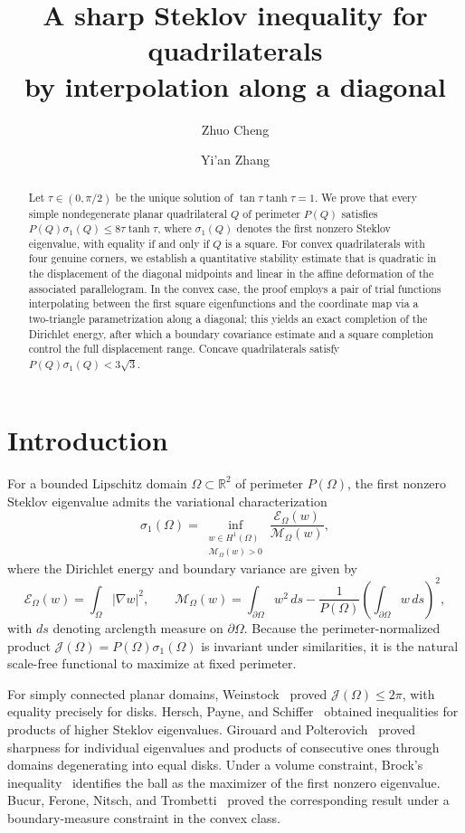 \documentclass[11pt]{amsart}
\title[Steklov inequalities for quadrilaterals]{A sharp Steklov inequality for quadrilaterals\protect\\ by interpolation along a diagonal}
\author{Zhuo Cheng}
\author{Yi'an Zhang}
\date{}
\theoremstyle{remark}\newtheorem{remark}[theorem]{Remark}
\numberwithin{equation}{section}
\begin{document}
\begin{abstract}
Let $\tau\in(0,\pi/2)$ be the unique solution of $\tan\tau\tanh\tau=1$. We prove that every simple nondegenerate planar quadrilateral $Q$ of perimeter $P(Q)$ satisfies $P(Q)\sigma_1(Q)\le 8\tau\tanh\tau$, where $\sigma_1(Q)$ denotes the first nonzero Steklov eigenvalue, with equality if and only if $Q$ is a square. For convex quadrilaterals with four genuine corners, we establish a quantitative stability estimate that is quadratic in the displacement of the diagonal midpoints and linear in the affine deformation of the associated parallelogram. In the convex case, the proof employs a pair of trial functions interpolating between the first square eigenfunctions and the coordinate map via a two-triangle parametrization along a diagonal; this yields an exact completion of the Dirichlet energy, after which a boundary covariance estimate and a square completion control the full displacement range. Concave quadrilaterals satisfy $P(Q)\sigma_1(Q)<3\sqrt{3}$.
\end{abstract}
\maketitle
\raggedbottom

\section{Introduction}

For a bounded Lipschitz domain $\Omega\subset\mathbb R^2$ of perimeter $P(\Omega)$, the first nonzero Steklov eigenvalue admits the variational characterization
\[
\sigma_1(\Omega)
=\inf_{\substack{w\in H^1(\Omega)\\ \mathcal M_\Omega(w)>0}}
\frac{\mathcal E_\Omega(w)}{\mathcal M_\Omega(w)},
\]
where the Dirichlet energy and boundary variance are given by
\[
\mathcal E_\Omega(w)=\int_\Omega|\nabla w|^2,
\qquad
\mathcal M_\Omega(w)=\int_{\partial\Omega}w^2\,ds
-\frac1{P(\Omega)}\left(\int_{\partial\Omega}w\,ds\right)^2,
\]
with $ds$ denoting arclength measure on $\partial\Omega$. Because the perimeter-normalized product $\mathcal J(\Omega)=P(\Omega)\sigma_1(\Omega)$ is invariant under similarities, it is the natural scale-free functional to maximize at fixed perimeter.

For simply connected planar domains, Weinstock~\cite{Weinstock1954}
proved $\mathcal J(\Omega)\le2\pi$, with equality precisely for disks.
Hersch, Payne, and Schiffer~\cite{HerschPayneSchiffer1974} obtained
inequalities for products of higher Steklov eigenvalues. Girouard and
Polterovich~\cite{GirouardPolterovich2010} proved sharpness for individual
eigenvalues and products of consecutive ones through domains degenerating
into equal disks. Under a volume constraint, Brock's
inequality~\cite{Brock2001} identifies the ball as the maximizer of the
first nonzero eigenvalue. Bucur, Ferone, Nitsch, and
Trombetti~\cite{BucurEtAl2021} proved the corresponding result under a
boundary-measure constraint in the convex class.
\end{document}
